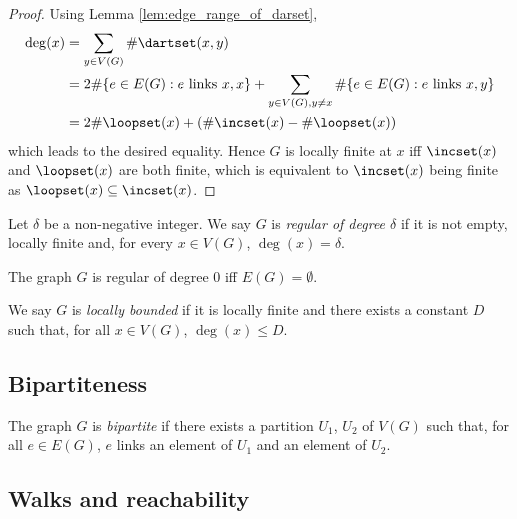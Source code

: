 \begin{proof}
  Using Lemma \ref{lem:edge_range_of_darset},
  \begin{align*}
    \deg(x)
    & = \sum_{y \in V(G)} \# \dartset(x,y) \\
    & = 2 \# \{e \in E(G) : e \text{ links }x,x\}
    + \sum_{y \in V(G), y \neq x} \# \{e \in E(G) : e \text{ links }x,y\}\\
    & = 2 \# \loopset(x) + (\# \incset(x) - \# \loopset(x))
  \end{align*}
  which leads to the desired equality. Hence $G$ is locally finite at $x$ iff
  $\incset(x)$ and $\loopset(x)$ are both finite, which is equivalent to
  $\incset(x)$ being finite as $\loopset(x) \subseteq \incset(x)$.
\end{proof}

\begin{definition}
  \label{def:regular}
  Let $\delta$ be a non-negative integer.
  We say $G$ is \emph{regular of degree $\delta$} if it is not empty, locally finite and,
  for every $x \in V(G)$, $\deg (x) = \delta$.
\end{definition}

\begin{lemma}
  \label{lem:regular_zero}
  The graph $G$ is regular of degree $0$ iff $E(G)=\emptyset$.
\end{lemma}

\begin{definition}
  \label{def:locally_bounded}
  We say $G$ is \emph{locally bounded} if
  it is locally finite and there exists a constant $D$ such that,
  for all $x \in V(G)$, $\deg(x) \leq D$.
\end{definition}


\subsection{Bipartiteness}

\begin{definition}
  \label{def:bipartite}
  The graph $G$ is \emph{bipartite} if there exists a partition $U_1$,
  $U_2$ of $V(G)$ such that, for all $e \in E(G)$, $e$ links an element of $U_1$
  and an element of $U_2$.
\end{definition}

\subsection{Walks and reachability}

